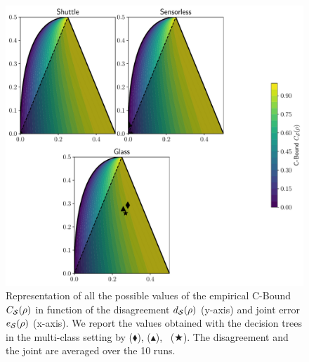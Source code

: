 \begin{noaddcontents}
\begin{figure}
    \centering
    \includegraphics[width=1.0\linewidth]{chapter_4/figures/cbound_tree_multi_2.pdf}
    \caption{
    Representation of all the possible values of the empirical C-Bound ${C}_{\mathcal{S}}(\rho)$ in function of the disagreement $d_{\mathcal{S}}(\rho)$ (y-axis) and joint error $e_{\mathcal{S}}(\rho)$ (x-axis).
We report the values obtained with the decision trees in the multi-class setting by  ($\blacklozenge$), \algomasegosa ($\blacktriangle$), \algogermain~($\bigstar$).
The disagreement and the joint are averaged over the 10 runs.
    }
    \label{chap:mv:fig:cbound-tree-multi-2}
\end{figure}


\end{noaddcontents}
